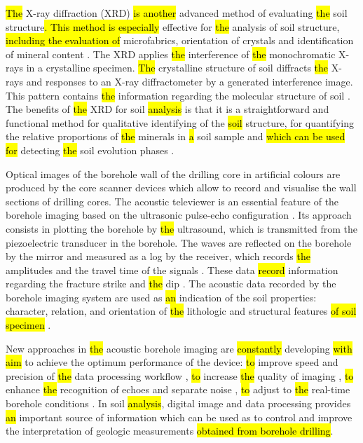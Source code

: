 \documentclass[USenglish,twocolumn]{article}
\begin{document}
\hl{The }X-ray diffraction (XRD) \hl{is another} advanced method of evaluating \hl{the }soil structure\hl{. This method is especially }effective for \hl{the }analysis of soil structure, \hl{including the evaluation of }microfabrics, orientation of crystals and identification of mineral content \cite{Denaix,Das,Righi}. The XRD applies \hl{the }interference of \hl{the }monochromatic X-rays in a crystalline specimen. \hl{The }crystalline structure of soil diffracts \hl{the }X-rays and responses to an X-ray diffractometer by a generated interference image. This pattern contains \hl{the }information regarding the molecular structure of soil \cite{ALDERTON2021520}. The benefits of \hl{the }XRD for soil \hl{analysis} is that it is a straightforward and functional method for qualitative identifying of the \hl{soil }structure, for quantifying the relative proportions of \hl{the }minerals in \hl{a }soil sample and \hl{which can be used for} detecting \hl{the }soil evolution phases \cite{ADAMS2019391}.

Optical images of the borehole wall of the drilling core in artificial colours are produced by the core scanner devices which allow to record and visualise the wall sections of drilling cores. The acoustic televiewer is an essential feature of the borehole imaging based on the ultrasonic pulse-echo configuration \cite{paillet1990borehole}. Its approach consists in plotting the borehole by \hl{the }ultrasound, which is transmitted from the piezoelectric transducer in the borehole. The waves are reflected on the borehole by the mirror and measured as a log by the receiver, which records \hl{the }amplitudes and the travel time of the signals \cite{RONQUILLOJARILLO20181}. These data \hl{record} information regarding the fracture strike and \hl{the }dip \cite{Paillet}. The acoustic data recorded by the borehole imaging system are used as \hl{an }indication of the soil properties: character, relation, and orientation of \hl{the }lithologic and structural features \hl{of soil specimen} \cite{WILLIAMS2004151}. 

New approaches in \hl{the }acoustic borehole imaging are \hl{constantly }developing \hl{with aim }to achieve the optimum performance of the device: \hl{to} improve speed and precision of \hl{the }data processing workflow \cite{schepers1991development,DELTOMBE2004161}, \hl{to} increase \hl{the }quality of imaging \cite{ALSIT2015139}, \hl{to} enhance \hl{the }recognition of echoes and separate noise \cite{WEDGE2017157}, \hl{to} adjust to \hl{the }real-time borehole conditions \cite{Jerram}. In soil \hl{analysis}, digital image\hl{ }and data processing provides \hl{an }important source of information which can be used as to control and improve the interpretation of geologic measurements \hl{obtained from borehole drilling}\cite{Kaellenetal2014,Kallenetal2016,Lemenkov2021c}.
\end{document}
